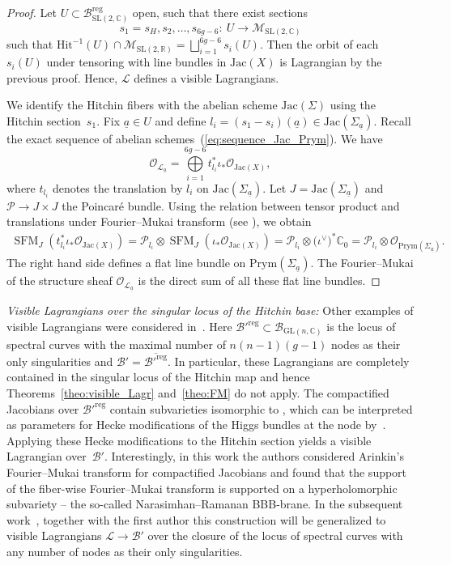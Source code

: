 \documentclass[pdftex]{sigma}
\numberwithin{equation}{section}
\theoremstyle{definition}
\newcommand{\reg}{\mathrm{reg}}
\newcommand{\Jac}{\mathrm{Jac}}
\renewcommand{\to}{\rightarrow}
\newcommand{\calB}{\mathcal{B}}
\newcommand{\calL}{\mathcal{L}}
\newcommand{\calM}{\mathcal{M}}
\newcommand{\calO}{\mathcal{O}}
\newcommand{\calP}{\mathcal{P}}
\newcommand{\RR}{\mathbb{R}}
\newcommand{\CC}{\mathbb{C}}
\newcommand{\PP}{\mathbb{P}}
\DeclareMathOperator{\SFM}{SFM}
\newcommand{\Prym}{\mathrm{Prym}}
\newcommand{\Hit}{\mathrm{Hit}}
\newcommand{\GL}{\mathrm{GL}}
\newcommand{\SL}{\mathrm{SL}}
\begin{document}
\begin{proof}
 Let $U \subset \calB^{\reg}_{\SL(2,\CC)}$ open, such that there exist sections
 \[ s_1=s_H, s_2, \dots, s_{6g-6}\colon \ U \to \calM_{\SL(2,\CC)}
 \]
 such that $\Hit^{-1}(U) \cap \calM_{\SL(2,\RR)} = \bigsqcup_{i=1}^{6g-6} s_i(U)$. Then the orbit of each $s_i(U)$ under tensoring with line bundles in $\Jac(X)$ is Lagrangian by the previous proof. Hence, $\calL$ defines a visible Lagrangians.

 We identify the Hitchin fibers with the abelian scheme $\Jac(\Sigma)$ using the Hitchin section~$s_1$. Fix $\underline{a} \in U$ and define $l_i = (s_1-s_i)(\underline{a}) \in \Jac(\Sigma_{\underline{a}})$. Recall the exact sequence of abelian schemes~(\ref{eq:sequence_Jac_Prym}). We have
 \[ \calO_{\calL_{\underline{a}}} = \bigoplus\limits_{i=1}^{6g-6} t^*_{l_i} \iota_* \calO_{\Jac(X)},
 \] where $t_{l_i}$ denotes the translation by $l_i$ on $\Jac(\Sigma_{\underline{a}})$. Let $J=\Jac(\Sigma_{\underline{a}})$ and $\calP \to J \times J$ the Poincar\'e bundle. Using the relation between tensor product and translations under Fourier--Mukai transform (see \cite{Schnell}), we obtain
 \begin{align*} \SFM_{J}(t^*_{l_i} \iota_*\calO_{\Jac(X)}) = \calP_{l_i} \otimes \SFM_{J}(\iota_* \calO_{\Jac(X)})= \calP_{l_i} \otimes \bigl(\iota^\vee\bigr)^* \CC_0 = \calP_{l_i} \otimes \calO_{\Prym(\Sigma_{\underline{a}})}.
 \end{align*}
 The right hand side defines a flat line bundle on $\Prym(\Sigma_{\underline{a}})$. The Fourier--Mukai of the structure sheaf $\calO_{\calL_{\underline{a}}}$ is the direct sum of all these flat line bundles.
\end{proof}


\textit{Visible Lagrangians over the singular locus of the Hitchin base:}
Other examples of visible Lagrangians were considered in~\cite{FGOP}. Here $\calB'^\reg \subset \calB_{\GL(n,\CC)}$ is the locus of spectral curves with the maximal number of $n(n-1)(g-1)$ nodes as their only singularities and $\calB'=\overline{\calB'^\reg}$. In particular, these Lagrangians are completely contained in the singular locus of the Hitchin map and hence Theorems~\ref{theo:visible_Lagr} and~\ref{theo:FM} do not apply. The compactified Jacobians over $\calB'^\reg$ contain subvarieties isomorphic to \smash{$\bigl(\PP^1\bigr)^{n(n-1)(g-1)}$}, which can be interpreted as parameters for Hecke modifications of the Higgs bundles at the node by~\cite{Horn1}. Applying these Hecke modifications to the Hitchin section yields a visible Lagrangian over~$\calB'$. Interestingly, in this work the authors considered Arinkin's Fourier--Mukai transform for compactified Jacobians and found that the support of the fiber-wise Fourier--Mukai transform is supported on a hyperholomorphic subvariety -- the so-called Narasimhan--Ramanan BBB-brane. In the subsequent work~\cite{FHHO}, together with the first author this construction will be generalized to visible Lagrangians $\calL \to \calB'$ over the closure of the locus of spectral curves with any number of nodes as their only singularities.
\end{document}
